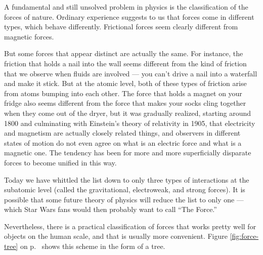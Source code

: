 A fundamental and still unsolved problem in physics is the classification
of the forces of nature. Ordinary experience suggests to us that forces
come in different types, which behave differently. Frictional forces seem
clearly different from magnetic forces.

But some forces that appear distinct
are actually the same. For instance, the friction that holds a nail into the wall
seems different from the kind of friction that we observe when fluids are involved ---
you can't drive a nail into a waterfall and make it stick. But at the atomic level,
both of these types of friction arise from atoms bumping into each other.
The force that holds a magnet on your fridge also seems different from the
force that makes your socks cling together when they come out of the dryer, but
it was gradually realized, starting around 1800 and culminating with Einstein's
theory of relativity in 1905, that electricity and magnetism are actually closely
related things, and observers in different states of motion do not even agree on
what is an electric force and what is a magnetic one. The tendency has been for
more and more superficially disparate forces to become unified in this way.

Today we have whittled the list down to only three types of interactions at the subatomic
level (called the gravitational, electroweak, and strong forces). It is possible
that some future theory of physics will reduce the list to only one --- which Star Wars fans
would then probably want to call ``The Force.''

Nevertheless, there is a practical classification of forces that works pretty well
for objects on the human scale, and that is usually more convenient. Figure \ref{fig:force-tree}
on p.~\pageref{fig:force-tree} shows this scheme in the form of a tree.

